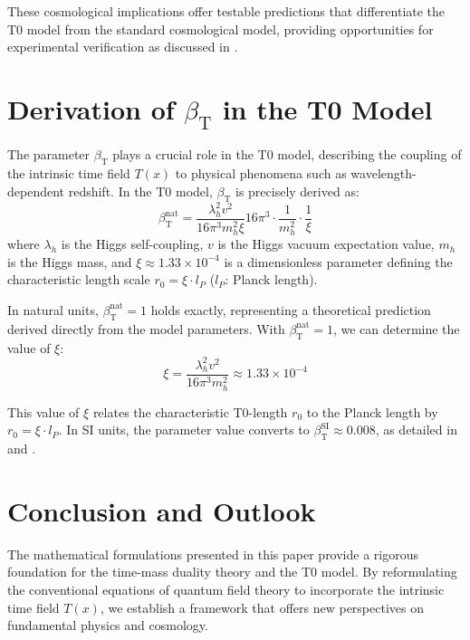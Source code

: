 \documentclass[12pt,a4paper]{article}
\newcommand{\Tfield}{T(x)}
\newcommand{\betaT}{\beta_{\text{T}}}
\theoremstyle{definition}
\theoremstyle{remark}
\begin{document}
	These cosmological implications offer testable predictions that differentiate the T0 model from the standard cosmological model, providing opportunities for experimental verification as discussed in \cite{pascher_messdifferenzen_2025}.
	
	\section{Derivation of \(\betaT\) in the T0 Model}
	The parameter \(\betaT\) plays a crucial role in the T0 model, describing the coupling of the intrinsic time field \(\Tfield\) to physical phenomena such as wavelength-dependent redshift. In the T0 model, \(\betaT\) is precisely derived as:
	\begin{equation}
		\betaT^{\text{nat}} = \frac{\lambda_h^2 v^2}{16\pi^3 m_h^2 \xi}{16\pi^3} \cdot \frac{1}{m_h^2} \cdot \frac{1}{\xi}
	\end{equation}
	where \(\lambda_h\) is the Higgs self-coupling, \(v\) is the Higgs vacuum expectation value, \(m_h\) is the Higgs mass, and \(\xi \approx 1.33 \times 10^{-4}\) is a dimensionless parameter defining the characteristic length scale \(r_0 = \xi \cdot l_P\) (\(l_P\): Planck length).
	
	In natural units, \(\betaT^{\text{nat}} = 1\) holds exactly, representing a theoretical prediction derived directly from the model parameters. With \(\betaT^{\text{nat}} = 1\), we can determine the value of \(\xi\):
	\begin{equation}
		\xi = \frac{\lambda_h^2 v^2}{16\pi^3 m_h^2} \approx 1.33 \times 10^{-4}
	\end{equation}
	
	This value of \(\xi\) relates the characteristic T0-length \(r_0\) to the Planck length by \(r_0 = \xi \cdot l_P\). In SI units, the parameter value converts to \(\betaT^{\text{SI}} \approx 0.008\), as detailed in \cite{pascher_alphabeta_2025} and \cite{pascher_params_2025}.
	
	\section{Conclusion and Outlook}
	The mathematical formulations presented in this paper provide a rigorous foundation for the time-mass duality theory and the T0 model. By reformulating the conventional equations of quantum field theory to incorporate the intrinsic time field \(\Tfield\), we establish a framework that offers new perspectives on fundamental physics and cosmology.
	
\end{document}

